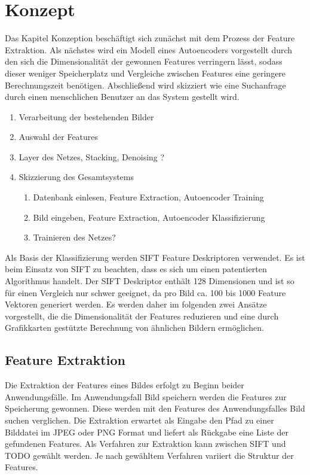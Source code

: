 \chapter{Konzept}

Das Kapitel Konzeption beschäftigt sich zunächst mit dem Prozess der Feature Extraktion. Als nächstes wird ein Modell eines Autoencoders vorgestellt durch den sich die Dimensionalität der gewonnen Features verringern lässt, sodass dieser weniger Speicherplatz und Vergleiche zwischen Features eine geringere Berechnungszeit benötigen. Abschließend wird skizziert wie eine Suchanfrage durch einen menschlichen Benutzer an das System gestellt wird.

\begin{enumerate}
	\item Verarbeitung der bestehenden Bilder
	\item Auswahl der Features
	\item Layer des Netzes, Stacking, Denoising ?
	\item Skizzierung des Gesamtsystems \begin{enumerate}
		\item Datenbank einlesen, Feature Extraction, Autoencoder Training
		\item Bild eingeben, Feature Extraction, Autoencoder Klassifizierung
		\item Trainieren des Netzes?
	\end{enumerate}		
	
\end{enumerate}

Als Basis der Klassifizierung werden SIFT Feature Deskriptoren verwendet. Es ist beim Einsatz von SIFT zu beachten, dass es sich um einen patentierten Algorithmus handelt. Der SIFT Deskriptor enthält 128 Dimensionen und ist so für einen Vergleich nur schwer geeignet, da pro Bild ca. 100 bis 1000 Feature Vektoren generiert werden. Es werden daher im folgenden zwei Ansätze vorgestellt, die die Dimensionalität der Features reduzieren und eine durch Grafikkarten gestützte Berechnung von ähnlichen Bildern ermöglichen.

\section{Feature Extraktion}

Die Extraktion der Features eines Bildes erfolgt zu Beginn beider Anwendungsfälle. Im Anwendungsfall Bild speichern werden die Features zur Speicherung gewonnen. Diese werden mit den Features des Anwendungsfalles Bild suchen verglichen. Die Extraktion erwartet als Eingabe den Pfad zu einer Bilddatei im JPEG oder PNG Format und liefert als Rückgabe eine Liste der gefundenen Features.  Als Verfahren zur Extraktion kann zwischen SIFT und TODO gewählt werden. Je nach gewähltem Verfahren variiert die Struktur der Features.


